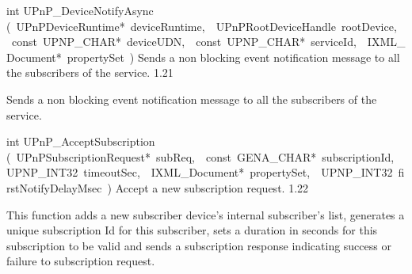 \documentclass{article}
\begin{document}
\begin{cxxentry}
\begin{cxxfunction}
\begin{cxxdoc}
\end{cxxdoc}
\end{cxxfunction}
\begin{cxxfunction}
{int}
        {UPnP\_DeviceNotifyAsync}
        {(\ UPnPDeviceRuntime*\ deviceRuntime,\ \ UPnPRootDeviceHandle\ rootDevice,\ \ const\ UPNP\_CHAR*\ deviceUDN,\ \ const\ UPNP\_CHAR*\ serviceId,\ \ IXML\_Document*\ propertySet\ )}
        {Sends a non blocking event notification message to all the subscribers of the service.}
        {1.21}
\begin{cxxdoc}
Sends a non blocking event notification message to all the subscribers of
the service.


\end{cxxdoc}
\end{cxxfunction}
\begin{cxxfunction}
{int}
        {UPnP\_AcceptSubscription}
        {(\ UPnPSubscriptionRequest*\ subReq,\ \ const\ GENA\_CHAR*\ subscriptionId,\ \ UPNP\_INT32\ timeoutSec,\ \ IXML\_Document*\ propertySet,\ \ UPNP\_INT32\ firstNotifyDelayMsec\ )}
        {Accept a new subscription request. }
        {1.22}
\begin{cxxdoc}
This function adds a new subscriber device's internal subscriber's list,
generates a unique subscription Id for this subscriber, sets a duration
in seconds for this subscription to be valid and sends a subscription
response indicating success or failure to subscription request.



\end{cxxdoc}
\end{cxxfunction}
\end{cxxentry}
\end{document}
